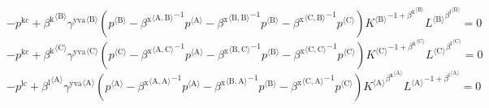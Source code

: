 \begin{equation}
-p^{\mathrm{kc}} + {{\beta^{\mathrm{k}}}^{\langle \mathrm{\mathrm{B}}\rangle}} {{\gamma^{\mathrm{yva}}}^{\langle \mathrm{\mathrm{B}}\rangle}} \left({p}^{\langle \mathrm{B}\rangle} - {{\beta^{\mathrm{x}}}^{\langle \mathrm{\mathrm{A}},\mathrm{\mathrm{B}}\rangle}}^{-1} {{p}^{\langle \mathrm{A}\rangle}} - {{\beta^{\mathrm{x}}}^{\langle \mathrm{\mathrm{B}},\mathrm{\mathrm{B}}\rangle}}^{-1} {{p}^{\langle \mathrm{B}\rangle}} - {{\beta^{\mathrm{x}}}^{\langle \mathrm{\mathrm{C}},\mathrm{\mathrm{B}}\rangle}}^{-1} {{p}^{\langle \mathrm{C}\rangle}}\right) {{{K}^{\langle \mathrm{B}\rangle}}^{-1 + {\beta^{\mathrm{k}}}^{\langle \mathrm{\mathrm{B}}\rangle}}} {{{L}^{\langle \mathrm{B}\rangle}}^{{\beta^{\mathrm{l}}}^{\langle \mathrm{\mathrm{B}}\rangle}}} = 0
\end{equation}
\begin{equation}
-p^{\mathrm{kc}} + {{\beta^{\mathrm{k}}}^{\langle \mathrm{\mathrm{C}}\rangle}} {{\gamma^{\mathrm{yva}}}^{\langle \mathrm{\mathrm{C}}\rangle}} \left({p}^{\langle \mathrm{C}\rangle} - {{\beta^{\mathrm{x}}}^{\langle \mathrm{\mathrm{A}},\mathrm{\mathrm{C}}\rangle}}^{-1} {{p}^{\langle \mathrm{A}\rangle}} - {{\beta^{\mathrm{x}}}^{\langle \mathrm{\mathrm{B}},\mathrm{\mathrm{C}}\rangle}}^{-1} {{p}^{\langle \mathrm{B}\rangle}} - {{\beta^{\mathrm{x}}}^{\langle \mathrm{\mathrm{C}},\mathrm{\mathrm{C}}\rangle}}^{-1} {{p}^{\langle \mathrm{C}\rangle}}\right) {{{K}^{\langle \mathrm{C}\rangle}}^{-1 + {\beta^{\mathrm{k}}}^{\langle \mathrm{\mathrm{C}}\rangle}}} {{{L}^{\langle \mathrm{C}\rangle}}^{{\beta^{\mathrm{l}}}^{\langle \mathrm{\mathrm{C}}\rangle}}} = 0
\end{equation}
\begin{equation}
-p^{\mathrm{lc}} + {{\beta^{\mathrm{l}}}^{\langle \mathrm{\mathrm{A}}\rangle}} {{\gamma^{\mathrm{yva}}}^{\langle \mathrm{\mathrm{A}}\rangle}} \left({p}^{\langle \mathrm{A}\rangle} - {{\beta^{\mathrm{x}}}^{\langle \mathrm{\mathrm{A}},\mathrm{\mathrm{A}}\rangle}}^{-1} {{p}^{\langle \mathrm{A}\rangle}} - {{\beta^{\mathrm{x}}}^{\langle \mathrm{\mathrm{B}},\mathrm{\mathrm{A}}\rangle}}^{-1} {{p}^{\langle \mathrm{B}\rangle}} - {{\beta^{\mathrm{x}}}^{\langle \mathrm{\mathrm{C}},\mathrm{\mathrm{A}}\rangle}}^{-1} {{p}^{\langle \mathrm{C}\rangle}}\right) {{{K}^{\langle \mathrm{A}\rangle}}^{{\beta^{\mathrm{k}}}^{\langle \mathrm{\mathrm{A}}\rangle}}} {{{L}^{\langle \mathrm{A}\rangle}}^{-1 + {\beta^{\mathrm{l}}}^{\langle \mathrm{\mathrm{A}}\rangle}}} = 0
\end{equation}
